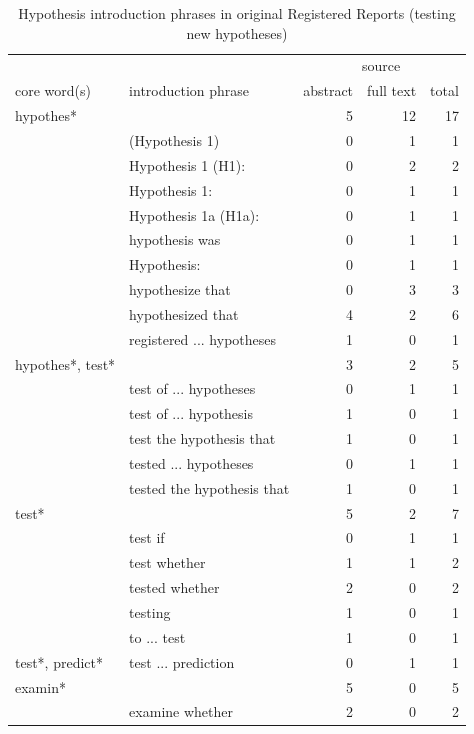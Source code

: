 \documentclass[british,,jou,floatsintext]{apa6}
\begin{document}
\begin{table}[tbp]

\begin{center}
\begin{threeparttable}

\caption{\label{tab:unnamed-chunk-6}Hypothesis introduction phrases in original Registered Reports (testing new hypotheses)}

\footnotesize{

\begin{tabular}{llrrr}
\toprule
 &  & \multicolumn{3}{c}{source} \\
\cmidrule(r){3-5}
core word(s) & introduction phrase & abstract & full text & total\\
\midrule
hypothes* &  & 5 & 12 & 17\\
 & (Hypothesis 1) & 0 & 1 & 1\\
 & Hypothesis 1 (H1): & 0 & 2 & 2\\
 & Hypothesis 1: & 0 & 1 & 1\\
 & Hypothesis 1a (H1a): & 0 & 1 & 1\\
 & hypothesis was & 0 & 1 & 1\\
 & Hypothesis: & 0 & 1 & 1\\
 & hypothesize that & 0 & 3 & 3\\
 & hypothesized that & 4 & 2 & 6\\
 & registered ... hypotheses & 1 & 0 & 1\\ \midrule
hypothes*, test* &  & 3 & 2 & 5\\
 & test of ... hypotheses & 0 & 1 & 1\\
 & test of ... hypothesis & 1 & 0 & 1\\
 & test the hypothesis that & 1 & 0 & 1\\
 & tested ... hypotheses & 0 & 1 & 1\\
 & tested the hypothesis that & 1 & 0 & 1\\ \midrule
test* &  & 5 & 2 & 7\\
 & test if & 0 & 1 & 1\\
 & test whether & 1 & 1 & 2\\
 & tested whether & 2 & 0 & 2\\
 & testing & 1 & 0 & 1\\
 & to ... test & 1 & 0 & 1\\ \midrule
test*, predict* & test ... prediction & 0 & 1 & 1\\ \midrule
examin* &  & 5 & 0 & 5\\
 & examine whether & 2 & 0 & 2\\

\end{tabular}}
\end{threeparttable}
\end{center}
\end{table}
\end{document}
